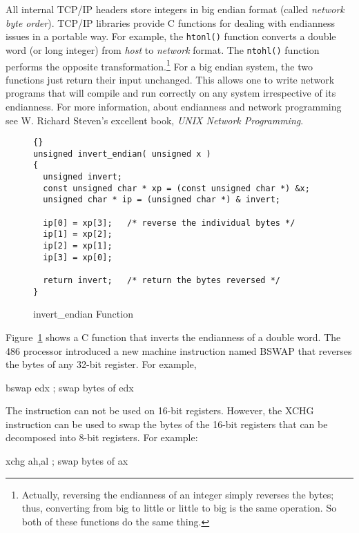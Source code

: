 All internal TCP/IP headers store integers in big endian format
(called \emph{network byte order}). TCP/IP libraries provide C
functions for dealing with endianness issues in a portable way.  For
example, the \lstinline|htonl()| function converts a double word (or
long integer) from \emph{host} to \emph{network} format. The
\lstinline|ntohl()| function performs the opposite
transformation.\footnote{Actually, reversing the endianness of an
integer simply reverses the bytes; thus, converting from big to little
or little to big is the same operation. So both of these functions do
the same thing.} For a big endian system, the two functions just
return their input unchanged. This allows one to write network
programs that will compile and run correctly on any system
irrespective of its endianness. For more information, about endianness
and network programming see W. Richard Steven's excellent book, 
\emph{UNIX Network Programming}.

\begin{figure}[t]
\begin{lstlisting}[frame=tlrb]{}
unsigned invert_endian( unsigned x )
{
  unsigned invert;
  const unsigned char * xp = (const unsigned char *) &x;
  unsigned char * ip = (unsigned char *) & invert;

  ip[0] = xp[3];   /* reverse the individual bytes */
  ip[1] = xp[2];
  ip[2] = xp[1];
  ip[3] = xp[0];

  return invert;   /* return the bytes reversed */
}
\end{lstlisting}
\caption{invert\_endian Function \label{fig:invertEndian}}
\end{figure}

Figure~\ref{fig:invertEndian} shows a C function that inverts the
endianness of a double word. The 486 processor introduced a new
machine instruction named {\code BSWAP}  that reverses
the bytes of any 32-bit register. For example,
\begin{AsmCodeListing}[frame=none,numbers=none]
      bswap   edx          ; swap bytes of edx
\end{AsmCodeListing}
The instruction can not be used on 16-bit registers. However, the
{\code XCHG}  instruction can be used to swap the bytes of
the 16-bit registers that can be decomposed into 8-bit registers. For
example:
\begin{AsmCodeListing}[frame=none,numbers=none]
      xchg    ah,al        ; swap bytes of ax
\end{AsmCodeListing}

